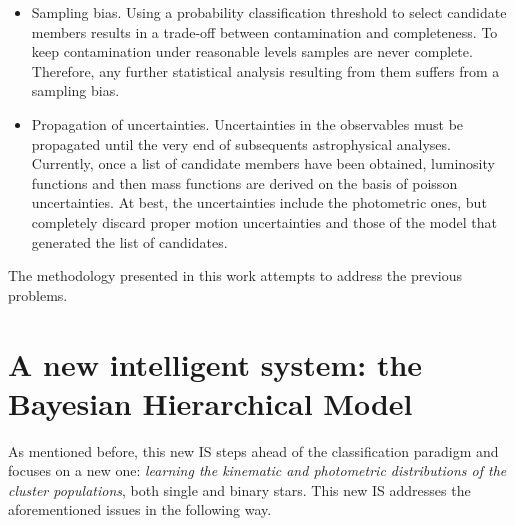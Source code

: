 \begin{itemize}
\item Sampling bias. Using a probability classification threshold to select candidate members results in a trade-off between contamination and completeness. To keep contamination under reasonable levels samples are never complete. Therefore, any further statistical analysis resulting from them suffers from a sampling bias.
\item Propagation of uncertainties. Uncertainties in the observables must be propagated until the very end of subsequents astrophysical analyses. Currently, once a list of candidate members have been obtained, luminosity functions and then mass functions are derived on the basis of poisson uncertainties. At best, the uncertainties include the photometric ones, but completely discard proper motion uncertainties and those of the model that generated the list of candidates.
\end{itemize}

The methodology presented in this work attempts to address the previous problems.

\section{A new intelligent system: the Bayesian Hierarchical Model}
\label{sect:newIS}

As mentioned before, this new IS steps ahead of the classification paradigm and focuses on a new one: \textit{learning the kinematic and photometric distributions of the cluster populations}, both single and binary stars. This new IS addresses the aforementioned issues in the following way.

